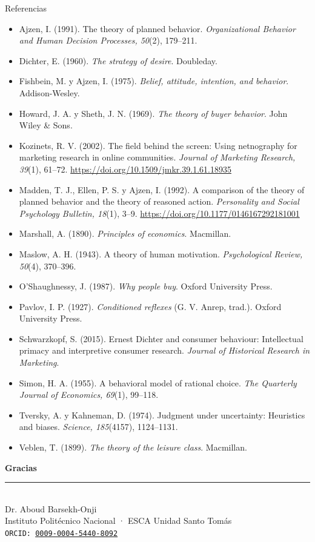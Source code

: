 \documentclass[aspectratio=169,xcolor=dvipsnames]{beamer}
\begin{document}
\begin{frame}{Referencias}
\tiny
\begin{itemize}
  \item[] Ajzen, I. (1991). The theory of planned behavior. \textit{Organizational Behavior and Human Decision Processes, 50}(2), 179--211.
  \item[] Dichter, E. (1960). \textit{The strategy of desire}. Doubleday.
  \item[] Fishbein, M. y Ajzen, I. (1975). \textit{Belief, attitude, intention, and behavior}. Addison-Wesley.
  \item[] Howard, J. A. y Sheth, J. N. (1969). \textit{The theory of buyer behavior}. John Wiley \& Sons.
  \item[] Kozinets, R. V. (2002). The field behind the screen: Using netnography for marketing research in online communities. \textit{Journal of Marketing Research, 39}(1), 61--72. \url{https://doi.org/10.1509/jmkr.39.1.61.18935}
  \item[] Madden, T. J., Ellen, P. S. y Ajzen, I. (1992). A comparison of the theory of planned behavior and the theory of reasoned action. \textit{Personality and Social Psychology Bulletin, 18}(1), 3--9. \url{https://doi.org/10.1177/0146167292181001}
  \item[] Marshall, A. (1890). \textit{Principles of economics}. Macmillan.
  \item[] Maslow, A. H. (1943). A theory of human motivation. \textit{Psychological Review, 50}(4), 370--396.
  \item[] O'Shaughnessy, J. (1987). \textit{Why people buy}. Oxford University Press.
  \item[] Pavlov, I. P. (1927). \textit{Conditioned reflexes} (G. V. Anrep, trad.). Oxford University Press.
  \item[] Schwarzkopf, S. (2015). Ernest Dichter and consumer behaviour: Intellectual primacy and interpretive consumer research. \textit{Journal of Historical Research in Marketing}.
  \item[] Simon, H. A. (1955). A behavioral model of rational choice. \textit{The Quarterly Journal of Economics, 69}(1), 99--118.
  \item[] Tversky, A. y Kahneman, D. (1974). Judgment under uncertainty: Heuristics and biases. \textit{Science, 185}(4157), 1124--1131.
  \item[] Veblen, T. (1899). \textit{The theory of the leisure class}. Macmillan.
\end{itemize}
\end{frame}

\begin{frame}
    \begin{center}
        {\Large \textcolor{IPNguinda}{\textbf{Gracias}}}\\[6pt]
        {\color{IPNdorado}\rule{0.4\linewidth}{1.2pt}}\\[6pt]
        Dr. Aboud Barsekh-Onji \\
        \small Instituto Politécnico Nacional · ESCA Unidad Santo Tomás \\
        \small \texttt{ORCID: \href{https://orcid.org/0009-0004-5440-8092}{0009-0004-5440-8092}}
    \end{center}
\end{frame}
\end{document}
